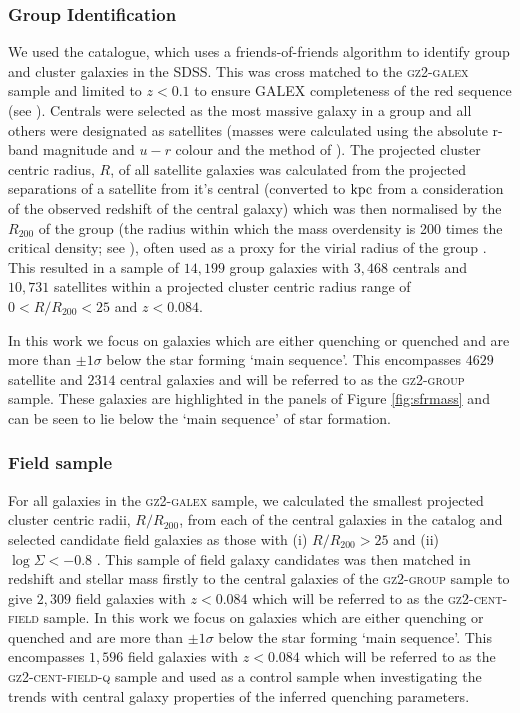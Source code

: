 \documentclass[useAMS,usenatbib]{mn2e}
\begin{document}
\subsubsection{Group Identification}\label{sec:groups}

We used the \citet{berlind06} catalogue, which uses a friends-of-friends algorithm to identify group and cluster galaxies in the SDSS. This was cross matched to the \textsc{gz2-galex} sample and limited to $z < 0.1$ to ensure GALEX completeness of the red sequence (see \citealt{wyder07, yesuf14}). Centrals were selected as the most massive galaxy in a group and all others were designated as satellites (masses were calculated using the absolute r-band magnitude and $u-r$ colour and the method of \citealt{baldry06}).  The projected cluster centric radius, $R$, of all satellite galaxies was calculated from the projected separations of a satellite from it's central (converted to $\rm{kpc}$ from a consideration of the observed redshift of the central galaxy) which was then normalised by the $R_{200}$ of the group (the radius within which the mass overdensity is 200 times the critical density; see \citealt{finn05}), often used as a proxy for the virial radius of the group \citep{navarro95}. This resulted in a sample of $14,199$ group galaxies with $3,468$ centrals and $10,731$ satellites within a projected cluster centric radius range of $0 < R/R_{200} < 25$ and $z < 0.084$. 

In this work we focus on galaxies which are either quenching or quenched and are more than $\pm1\sigma$ below the star forming `main sequence'. This encompasses $4629$ satellite and $2314$ central galaxies and will be referred to as the \textsc{gz2-group} sample. These galaxies are highlighted in the panels of Figure \ref{fig:sfrmass} and can be seen to lie below the `main sequence' of star formation. 

\subsubsection{Field sample}\label{sec:field}

For all galaxies in the \textsc{gz2-galex} sample, we calculated the smallest projected cluster centric radii, $R/R_{200}$, from each of the central galaxies in the  \citet{berlind06} catalog and selected candidate field galaxies as those with (i) $R/R_{200} > 25$ and (ii) $\log\Sigma < -0.8$ \citep[a measure of environmental density from][]{baldry06}. This sample of field galaxy candidates was then matched in redshift and stellar mass firstly to the central galaxies of the \textsc{gz2-group} sample to give $2,309$ field galaxies with $z < 0.084$ which will be referred to as the \textsc{gz2-cent-field} sample. In this work we focus on galaxies which are either quenching or quenched and are more than $\pm1\sigma$ below the star forming `main sequence'. This encompasses $1,596$ field galaxies with $z < 0.084$ which will be referred to as the \textsc{gz2-cent-field-q} sample and used as a control sample when investigating the trends with central galaxy properties of the inferred quenching parameters. 
\end{document}
